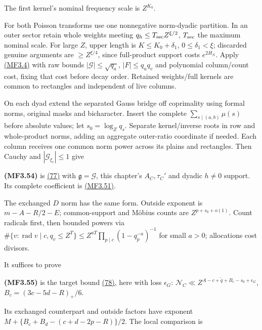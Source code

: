 The first kernel's nominal frequency scale is \(Z^{K_0}\).

For both Poisson transforms use one nonnegative norm-dyadic partition. In an outer sector retain whole weights meeting \(q_h\le T_{\rm sec}Z^{\xi/2}\), \(T_{\rm sec}\) the maximum nominal scale. For large \(Z\), upper length is \(K\le K_0+\delta_1\), \(0\le\delta_1<\xi\); discarded genuine arguments are \(\ge Z^{\xi/4}\), since full-product support costs \(e^{2H_N}\). Apply \protect\hyperlink{mf:eq:B3.4}{(MF3.4)} with raw bounds \(|\mathcal G|\le\sqrt{q_a}\), \(|F|\le q_uq_v\) and polynomial column/count cost, fixing that cost before decay order. Retained weights/full kernels are common to rectangles and independent of live columns.

On each dyad extend the separated Gauss bridge off coprimality using formal norms, original masks and bicharacter. Insert the complete \(\sum_{s\mid(a,b)}\mu(s)\) before absolute values; let \(s_0=\log_Zq_s\). Separate kernel/inverse roots in row and whole-product norms, adding an aggregate outer-ratio coordinate if needed. Each column receives one common norm power across its plains and rectangles. Then Cauchy and \(|\mathcal G_{\xi_r}|\le1\) give

\hypertarget{mf:eq:B3.54}{}

\label{mf:eq:B3.54}

\textbf{(MF3.54)} is \protect\hyperlink{cf:eq:D.13}{(77)} with \(\mathfrak g=\mathcal G\), this chapter's \(A_C,\tau_C'\) and dyadic \(h\ne0\) support. Its complete coefficient is \protect\hyperlink{mf:eq:B3.51}{(MF3.51)}.

The exchanged \(D\) norm has the same form. Outside exponent is \(m-A-R/2-E\); common-support and Möbius counts are \(Z^{p+s_0+o(1)}\). Count radicals first, then bounded powers via \(\#\{v:\operatorname{rad}v\mid c,q_v\le Z^T\}\le Z^{aT}\prod_{p\mid c}(1-q_p^{-a})^{-1}\) for small \(a>0\); allocations cost divisors.

It suffices to prove

\hypertarget{mf:eq:B3.55}{}

\label{mf:eq:B3.55}

\textbf{(MF3.55)} is the target bound \protect\hyperlink{cf:eq:D.14}{(78)}, here with loss \(\epsilon_G\): \(\mathcal N_C\ll Z^{A-c+\widetilde q+B_c-s_0+\epsilon_G}\), \(B_c=(3c-5d-R)_+/6\).

Its exchanged counterpart and outside factors have exponent \(M+\{B_c+B_d-(c+d-2p-R)\}/2\). The local comparison is

